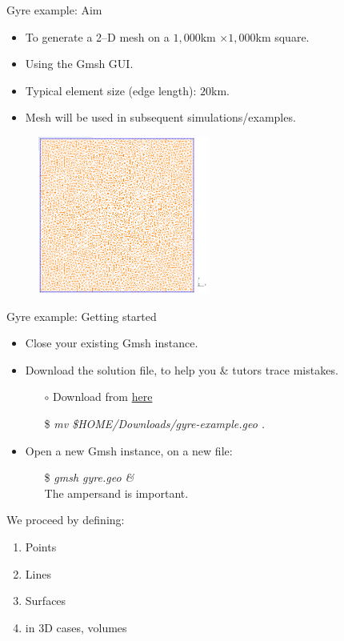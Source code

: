 \documentclass[t]{beamer}
\begin{document}
\begin{frame}{Gyre example: Aim}

\begin{itemize}
    \item To generate a 2--D mesh on a $1,000$km $\times 1,000$km square.
    \item Using the Gmsh GUI.
    \item Typical element size (edge length): $20$km.
    \item Mesh will be used in subsequent simulations/examples.
\end{itemize}

\begin{figure}[htbp]
 \centering
  \includegraphics[width=0.5\textwidth]{figures/2d-example-mesh}
\end{figure}

\end{frame}


\begin{frame}{Gyre example: Getting started}
    \begin{itemize}
        \item Close your existing Gmsh instance.
        \item Download the solution file, to help you \& tutors trace mistakes.
        \begin{itemize}
            \item[$\circ$] Download from \href{http://figshare.com/s/85271e16603d11e4840b06ec4bbcf141}{here}
            \item[\$] \emph{mv \$HOME/Downloads/gyre-example.geo .}
        \end{itemize}
        \item Open a new Gmsh instance, on a new file:
        \begin{itemize}
            \item[\$] \emph{gmsh gyre.geo \&} \\ \hspace{10pt} The ampersand is important.\vspace{10pt}
        \end{itemize}
    \end{itemize}
    We proceed by defining:
    \begin{enumerate}
        \item Points
        \item Lines
        \item Surfaces
        \item in 3D cases, volumes
    \end{enumerate}
\end{frame}
\end{document}
